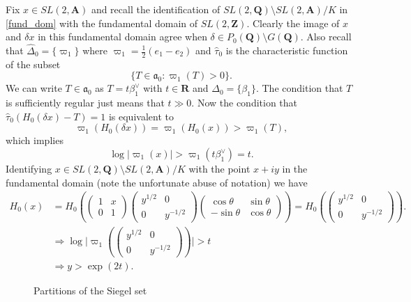 \documentclass[11pt]{amsart}
\def\A{\mathbf A}
\def\Q{\mathbf Q}
\def\R{\mathbf R}
\def\Z{\mathbf Z}
\def\aaa{\mathfrak a}
\def\bs{\setminus}
\def\mod#1{\lvert #1 \rvert} %
\theoremstyle{remark}
\begin{document}
Fix $x \in SL(2, \A)$ and recall the identification of $SL(2, \Q)\bs SL(2, \A) / K$ in \cref{fund_dom} with the fundamental domain of $SL(2, \Z)$. Clearly the image of $x$ and $\delta x$ in this fundamental domain agree when $\delta \in P_0(\Q) \bs G(\Q)$. 
Also recall that $\hat\Delta_0 = \{\varpi_1\}$ where $\varpi_1 = \frac{1}{2}(e_1 - e_2)$ and $\hat \tau_0$ is the characteristic function of the subset 
\[ \{ T \in \aaa_0 : \varpi_1(T) > 0 \}. \]
We can write $T \in \aaa_0$ as $T = t \beta_1^\vee$ with $t \in \R$ and $\Delta_0 = \{\beta_1\}$. The condition that $T$ is sufficiently regular just means that $t \gg 0$. Now the condition that $\hat\tau_0 (H_0(\delta x) - T) = 1$ is equivalent to 
\[ \varpi_1(H_0(\delta x)) = \varpi_1(H_0(x)) > \varpi_1(T), \]
which implies
\[ \log \mod{\varpi_1(x)} > \varpi_1(t \beta_1^\vee) = t. \]
Identifying $x \in SL(2, \Q)\bs SL(2, \A) / K$ with the point $x + iy$ in the fundamental domain (note the unfortunate abuse of notation) we have
\begin{equation} \label{x_decom}
	\begin{aligned} 
		H_0(x) & = H_0 \left(\begin{pmatrix} 1 & x \\ 0 & 1 \end{pmatrix} \begin{pmatrix} y^{1/2} & 0 \\ 0 & y^{-1/2} \end{pmatrix} \begin{pmatrix} \cos \theta & \sin \theta \\ -\sin \theta & \cos \theta \end{pmatrix} \right) 
		 = H_0 \left( \begin{pmatrix} y^{1/2} & 0 \\ 0 & y^{-1/2} \end{pmatrix} \right). \\
	& \Rightarrow \log \mod{\varpi_1(\begin{pmatrix} y^{1/2} & 0 \\ 0 & y^{-1/2} \end{pmatrix})} > t \\
	& \Rightarrow y > \exp(2t).
	\end{aligned}
\end{equation}

\begin{figure} 
\centering
\caption{Partitions of the Siegel set} \label{fig:sd}
\end{figure}
\end{document}
